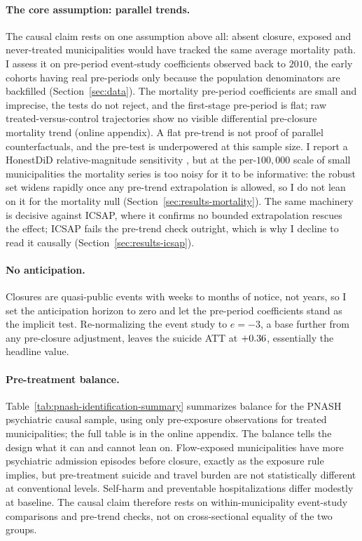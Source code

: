 \paragraph{The core assumption: parallel trends.} The causal claim rests
on one assumption above all: absent closure, exposed and never-treated
municipalities would have tracked the same average mortality path. I assess
it on pre-period event-study coefficients observed back to $2010$, the
early cohorts having real pre-periods only because the population
denominators are backfilled (Section~\ref{sec:data}). The mortality
pre-period coefficients are small and imprecise, the tests do not reject,
and the first-stage pre-period is flat; raw treated-versus-control
trajectories show no visible differential pre-closure mortality trend
(online appendix). A flat pre-trend is not proof of parallel
counterfactuals, and the pre-test is underpowered at this sample size. I
report a HonestDiD relative-magnitude sensitivity
\citep{rambachanRoth2023}, but at the per-$100{,}000$ scale of small
municipalities the mortality series is too noisy for it to be informative:
the robust set widens rapidly once any pre-trend extrapolation is allowed,
so I do not lean on it for the mortality null
(Section~\ref{sec:results-mortality}). The same machinery is decisive
against ICSAP, where it confirms no bounded extrapolation rescues the
effect; ICSAP fails the pre-trend check outright, which is why I decline to
read it causally (Section~\ref{sec:results-icsap}).

\paragraph{No anticipation.} Closures are quasi-public events with weeks to
months of notice, not years, so I set the anticipation horizon to zero and
let the pre-period coefficients stand as the implicit test. Re-normalizing
the event study to $e=-3$, a base further from any pre-closure adjustment,
leaves the suicide ATT at $+0.36$, essentially the headline
value.

\paragraph{Pre-treatment balance.}
Table~\ref{tab:pnash-identification-summary} summarizes balance for the
PNASH psychiatric causal sample, using only pre-exposure observations for
treated municipalities; the full table is in the online appendix. The
balance tells the design what it can and cannot lean on. Flow-exposed
municipalities have more psychiatric admission episodes before closure,
exactly as the exposure rule implies, but pre-treatment suicide and
travel burden are not statistically different at conventional levels.
Self-harm and preventable hospitalizations differ modestly at baseline.
The causal claim therefore rests on within-municipality event-study
comparisons and pre-trend checks, not on cross-sectional equality of the
two groups.

